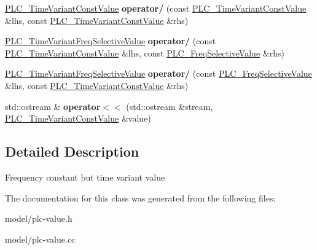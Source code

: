 \begin{DoxyCompactItemize}
\item 
\hypertarget{classns3_1_1PLC__TimeVariantConstValue_ab98ac2f9f37bf74d76f01bb2990e89ac}{\hyperlink{classns3_1_1PLC__TimeVariantConstValue}{\-P\-L\-C\-\_\-\-Time\-Variant\-Const\-Value} {\bfseries operator/} (const \hyperlink{classns3_1_1PLC__TimeVariantConstValue}{\-P\-L\-C\-\_\-\-Time\-Variant\-Const\-Value} \&lhs, const \hyperlink{classns3_1_1PLC__TimeVariantConstValue}{\-P\-L\-C\-\_\-\-Time\-Variant\-Const\-Value} \&rhs)}\label{classns3_1_1PLC__TimeVariantConstValue_ab98ac2f9f37bf74d76f01bb2990e89ac}

\item 
\hypertarget{classns3_1_1PLC__TimeVariantConstValue_a0655c0e755a478cc0b4f5a1c23c9efd9}{\hyperlink{classns3_1_1PLC__TimeVariantFreqSelectiveValue}{\-P\-L\-C\-\_\-\-Time\-Variant\-Freq\-Selective\-Value} {\bfseries operator/} (const \hyperlink{classns3_1_1PLC__TimeVariantConstValue}{\-P\-L\-C\-\_\-\-Time\-Variant\-Const\-Value} \&lhs, const \hyperlink{classns3_1_1PLC__FreqSelectiveValue}{\-P\-L\-C\-\_\-\-Freq\-Selective\-Value} \&rhs)}\label{classns3_1_1PLC__TimeVariantConstValue_a0655c0e755a478cc0b4f5a1c23c9efd9}

\item 
\hypertarget{classns3_1_1PLC__TimeVariantConstValue_ac83aa895ecbeab5a39607bac5dfdd80a}{\hyperlink{classns3_1_1PLC__TimeVariantFreqSelectiveValue}{\-P\-L\-C\-\_\-\-Time\-Variant\-Freq\-Selective\-Value} {\bfseries operator/} (const \hyperlink{classns3_1_1PLC__FreqSelectiveValue}{\-P\-L\-C\-\_\-\-Freq\-Selective\-Value} \&lhs, const \hyperlink{classns3_1_1PLC__TimeVariantConstValue}{\-P\-L\-C\-\_\-\-Time\-Variant\-Const\-Value} \&rhs)}\label{classns3_1_1PLC__TimeVariantConstValue_ac83aa895ecbeab5a39607bac5dfdd80a}

\item 
\hypertarget{classns3_1_1PLC__TimeVariantConstValue_a83a77d3b9900f68fb908ada656e48283}{std\-::ostream \& {\bfseries operator$<$$<$} (std\-::ostream \&stream, \hyperlink{classns3_1_1PLC__TimeVariantConstValue}{\-P\-L\-C\-\_\-\-Time\-Variant\-Const\-Value} \&value)}\label{classns3_1_1PLC__TimeVariantConstValue_a83a77d3b9900f68fb908ada656e48283}

\end{DoxyCompactItemize}


\subsection{\-Detailed \-Description}
\-Frequency constant but time variant value 

\-The documentation for this class was generated from the following files\-:\begin{DoxyCompactItemize}
\item 
model/plc-\/value.\-h\item 
model/plc-\/value.\-cc\end{DoxyCompactItemize}
